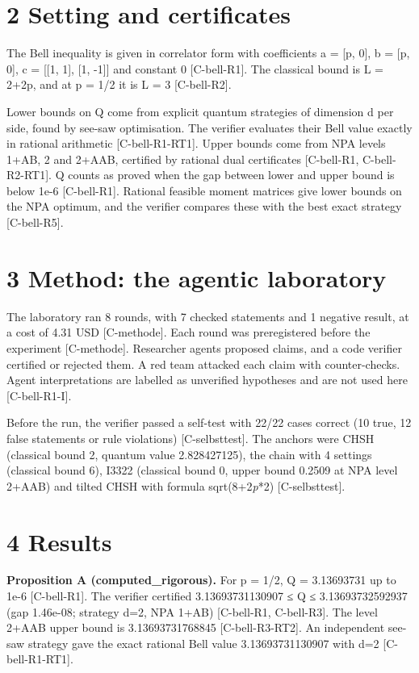 \documentclass[10pt,twocolumn]{article}
\begin{document}
\section{2 Setting and certificates}

The Bell inequality is given in correlator form with coefficients a = [p, 0], b = [p, 0], c = [[1, 1], [1, -1]] and constant 0 {\scriptsize[C-bell-R1]}. The classical bound is L = 2+2p, and at p = 1/2 it is L = 3 {\scriptsize[C-bell-R2]}.

Lower bounds on Q come from explicit quantum strategies of dimension d per side, found by see-saw optimisation. The verifier evaluates their Bell value exactly in rational arithmetic {\scriptsize[C-bell-R1-RT1]}. Upper bounds come from NPA levels 1+AB, 2 and 2+AAB, certified by rational dual certificates {\scriptsize[C-bell-R1, C-bell-R2-RT1]}. Q counts as proved when the gap between lower and upper bound is below 1e-6 {\scriptsize[C-bell-R1]}. Rational feasible moment matrices give lower bounds on the NPA optimum, and the verifier compares these with the best exact strategy {\scriptsize[C-bell-R5]}.

\section{3 Method: the agentic laboratory}

The laboratory ran 8 rounds, with 7 checked statements and 1 negative result, at a cost of 4.31 USD {\scriptsize[C-methode]}. Each round was preregistered before the experiment {\scriptsize[C-methode]}. Researcher agents proposed claims, and a code verifier certified or rejected them. A red team attacked each claim with counter-checks. Agent interpretations are labelled as unverified hypotheses and are not used here {\scriptsize[C-bell-R1-I]}.

Before the run, the verifier passed a self-test with 22/22 cases correct (10 true, 12 false statements or rule violations) {\scriptsize[C-selbsttest]}. The anchors were CHSH (classical bound 2, quantum value 2.828427125), the chain with 4 settings (classical bound 6), I3322 (classical bound 0, upper bound 0.2509 at NPA level 2+AAB) and tilted CHSH with formula sqrt(8+2\emph{p}*2) {\scriptsize[C-selbsttest]}.

\section{4 Results}

\textbf{Proposition A (computed_rigorous).} For p = 1/2, Q = 3.13693731 up to 1e-6 {\scriptsize[C-bell-R1]}. The verifier certified 3.13693731130907 ≤ Q ≤ 3.13693732592937 (gap 1.46e-08; strategy d=2, NPA 1+AB) {\scriptsize[C-bell-R1, C-bell-R3]}. The level 2+AAB upper bound is 3.13693731768845 {\scriptsize[C-bell-R3-RT2]}. An independent see-saw strategy gave the exact rational Bell value 3.13693731130907 with d=2 {\scriptsize[C-bell-R1-RT1]}.
\end{document}
